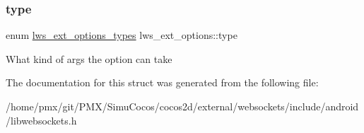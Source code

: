\subsubsection{\texorpdfstring{type}{type}}
{\footnotesize\ttfamily enum \hyperlink{group__extensions_gacc9f55936dc165257a2e1f7d47bce89e}{lws\+\_\+ext\+\_\+options\+\_\+types} lws\+\_\+ext\+\_\+options\+::type}

What kind of args the option can take 

The documentation for this struct was generated from the following file\+:\begin{DoxyCompactItemize}
\item 
/home/pmx/git/\+P\+M\+X/\+Simu\+Cocos/cocos2d/external/websockets/include/android/libwebsockets.\+h\end{DoxyCompactItemize}
